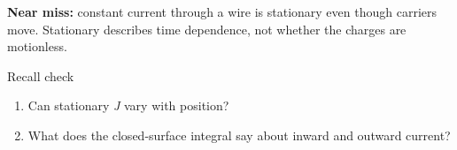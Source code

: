 \documentclass[11pt]{article}
\begin{document}
\begin{keepsection}
\begin{notebox}\textbf{Near miss:} constant current through a wire is stationary even though carriers move. Stationary describes time dependence, not whether the charges are motionless.\end{notebox}

\begin{recallbox}{Recall check}
\begin{enumerate}
\item Can stationary \textit{J} vary with position?
\item What does the closed-surface integral say about inward and outward current?
\end{enumerate}

\end{recallbox}
\end{keepsection}
\end{document}
